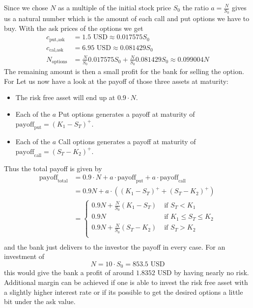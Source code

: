 \documentclass[11pt,oneside,a4paper]{article}
\begin{document}
	Since we chose $ N $ as a multiple of the initial stock price $ S_0 $ the ratio $ a = \frac{N}{S_0} $ gives us a natural number which is the amount of each call and put options we have to buy.
	With the ask prices of the options we get 
	\begin{align*}
	c_{\text{put,ask}} &= 1.5 \text{ USD} \approx 0.017575 S_0 \\
	c_{\text{cal,ask}} &= 6.95 \text{ USD} \approx 0.081429 S_0  \\
	N_{\text{options}} &= \frac{N}{S_0} 0.017575 S_0 + \frac{N}{S_0} 0.081429 S_0 \approx 0.099004 N
	\end{align*}
	The remaining amount  is then a small profit for the bank for selling the option. For  Let us now have a look at the payoff of those three assets at maturity:
	\begin{itemize}
		\item The risk free asset will end up at $ 0.9\cdot N $.
		\item Each of the $ a $ Put options generates a payoff at maturity of $ \text{payoff}_{\text{put}} = (K_1-S_T)^{+} $.
		\item Each of the $ a $ Call options generates a payoff at maturity of $ \text{payoff}_{\text{call}} = (S_T- K_2)^{+} $.
	\end{itemize}
	Thus the total payoff is given by
	\begin{align*}
		\text{payoff}_{\text{total}} &= 0.9\cdot	N + a \cdot \text{payoff}_{\text{put}} + a \cdot \text{payoff}_{\text{call}} \\ &= 0.9N + a\cdot((K_1-S_T)^+ + (S_T- K_2)^+) \\
		&=
		\begin{cases}
				0.9N + \frac{N}{S_0}(K_1 - S_T) \; &\text{if } S_T < K_1 \\
				0.9N  \; &\text{if } K_1 \leq S_T \leq K_2 \\
				0.9N + \frac{N}{S_0}(S_T-K_2) \; &\text{if }S_T > K_2 \\
		\end{cases} \\
	\end{align*}
	and the bank just delivers to the investor the payoff in every case. 
	For an investment of \[N = 10\cdot S_0 = 853.5 \text{ USD} \] this would give the bank a profit of around $ 1.8352 \text{ USD} $ by having nearly no risk. Additional margin can be achieved if one is able to invest the risk free asset with a slightly higher interest rate or if its possible to get the desired options a little bit under the ask value.
	\newpage
\end{document}
